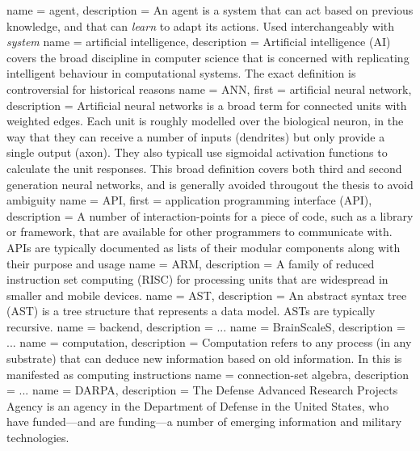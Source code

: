  {
  name = agent,
  description = {An agent is a system that can act based on previous knowledge,
		 and that can \textit{learn} to adapt its actions.
	         Used interchangeably with \textit{system}}
}
 {
    name = artificial intelligence,
    description = {Artificial intelligence (AI) covers the broad discipline in computer science
that is concerned with replicating intelligent behaviour in computational systems. The exact
definition is controversial for historical reasons \autocite{Nilsson2009}}
}
 {
  name = ANN,
  first = {artificial neural network},
  description = {
    Artificial neural networks is a broad term for connected units with 
    weighted edges.
    Each unit is roughly modelled over the biological neuron, in the way 
    that they can receive a number of inputs (dendrites) 
    but only provide a single output (axon).
    They also typicall use sigmoidal activation functions to calculate the 
    unit responses.
    This broad definition covers both third and second generation neural
    networks, and is generally avoided througout the thesis to avoid 
    ambiguity}
}
 {
  name = API,
  first = {application programming interface (API)},
  description = {A number of interaction-points for a piece of code,
		 such as a library or framework, that are available for
		 other programmers to communicate with. APIs are typically
		 documented as lists of their modular components along
		 with their purpose and usage}
}
 {
  name = {ARM},
  description = {A family of reduced instruction set computing (RISC) for 
                 processing units that are widespread in smaller and mobile
		 devices.}
}
 {
  name = {AST},
  description = {An abstract syntax tree (AST) is a tree structure that 
                 represents a data model. ASTs are typically recursive.}
}
 {
  name = backend,
  description = {...}
}
 {
  name = BrainScaleS,
  description = {...}
}
 {
   name = computation,
   description = {Computation refers to any process (in any
substrate) that can deduce new information based on old information. In
this is manifested as computing instructions}
}
 {
  name = {connection-set algebra},
  description = {...}
}
 {
  name = {DARPA},
  description = {The Defense Advanced Research Projects Agency is an agency
                 in the Department of Defense in the United States, who
		 have funded---and are funding---a number of emerging information
		 and military technologies.}
}
